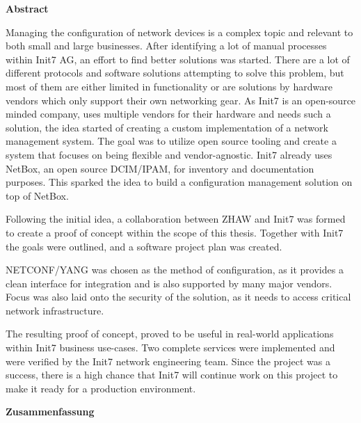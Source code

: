 \clearpage
\null
\vfil %
\begin{center}\textbf{Abstract}\end{center}

Managing the configuration of network devices is a complex topic and relevant
to both small and large businesses. After identifying a lot of manual processes within Init7 AG,
an effort to find better solutions was started. There are a lot of different protocols and
software solutions attempting to solve this problem, but most of them are either
limited in functionality or are solutions by hardware vendors which only support
their own networking gear.
As Init7 is an open-source minded company, uses multiple vendors for their hardware
and needs such a solution, the idea started of creating a custom implementation
of a network management system. The goal was to utilize open source tooling
and create a system that focuses on being flexible and vendor-agnostic.
Init7 already uses NetBox, an open source DCIM/IPAM, for inventory and documentation purposes.
This sparked the idea to build a configuration management solution on top of NetBox.

Following the initial idea, a collaboration between ZHAW and Init7 was formed to
create a proof of concept within the scope of this thesis. Together with Init7
the goals were outlined, and a software project plan was created.

NETCONF/YANG was chosen as the method of configuration, as it provides a clean
interface for integration and is also supported by many major vendors.
Focus was also laid onto the security of the solution, as it needs to access
critical network infrastructure.

The resulting proof of concept, proved to be useful in real-world applications
within Init7 business use-cases. Two complete services were implemented and were
verified by the Init7 network engineering team. Since the project was a success,
there is a high chance that Init7 will continue work on this project to make it
ready for a production environment.

\clearpage
\null
\vfil %
\begin{center}\textbf{Zusammenfassung}\end{center}

